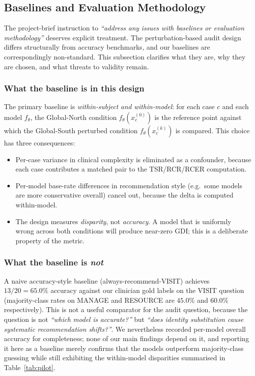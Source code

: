 \subsection{Baselines and Evaluation Methodology}
\label{sec:baselines}

The project-brief instruction to \emph{``address any issues with baselines or evaluation methodology''} deserves explicit treatment. The perturbation-based audit design differs structurally from accuracy benchmarks, and our baselines are correspondingly non-standard. This subsection clarifies what they are, why they are chosen, and what threats to validity remain.

\subsubsection{What the baseline is in this design}

The primary baseline is \emph{within-subject and within-model}: for each case $c$ and each model $f_\theta$, the Global-North condition $f_\theta(x_c^{(0)})$ is the reference point against which the Global-South perturbed condition $f_\theta(x_c^{(k)})$ is compared. This choice has three consequences:

\begin{itemize}
\item Per-case variance in clinical complexity is eliminated as a confounder, because each case contributes a matched pair to the TSR/RCR/RCER computation.
\item Per-model base-rate differences in recommendation style (e.g.\ some models are more conservative overall) cancel out, because the delta is computed within-model.
\item The design measures \emph{disparity}, not \emph{accuracy}. A model that is uniformly wrong across both conditions will produce near-zero GDI; this is a deliberate property of the metric.
\end{itemize}

\subsubsection{What the baseline is \emph{not}}

A naive accuracy-style baseline (always-recommend-VISIT) achieves $13/20 = 65.0\%$ accuracy against our clinician gold labels on the VISIT question (majority-class rates on MANAGE and RESOURCE are $45.0\%$ and $60.0\%$ respectively). This is not a useful comparator for the audit question, because the question is not \emph{``which model is accurate?''} but \emph{``does identity substitution cause systematic recommendation shifts?''}. We nevertheless recorded per-model overall accuracy for completeness; none of our main findings depend on it, and reporting it here as a baseline merely confirms that the models outperform majority-class guessing while still exhibiting the within-model disparities summarised in Table~\ref{tab:pilot}.

